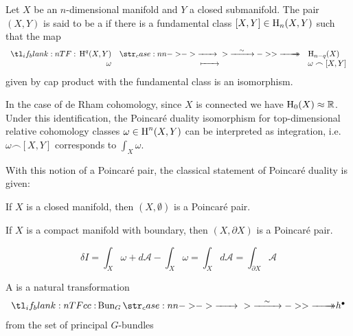 
\begin{definition}\label{defn:poincare-pair}
	Let $X$ be an $n$-dimensional manifold and $Y$ a closed submanifold. The pair $(X,Y)$ is said to be a  if there is a fundamental class $[X, Y]\in \operatorname{H}_n(X,Y)$ such that the map
	\[
		\lkxfunc{}{\H^q(X,Y)}{\H_{n-q}(X)}{\omega}{\omega \frown [X, Y]}
	\]
	given by cap product with the fundamental class is an isomorphism.
\end{definition}

\begin{remark}\label{rmk:duality-integration}
In the case of de Rham cohomology, since $X$ is connected we have $\operatorname{H}_0(X)\approx \mathbb{R}$. Under this identification, the Poincar\'e duality isomorphism for top-dimensional relative cohomology classes $\omega\in \operatorname{H}^n(X,Y)$ can be interpreted as integration, i.e. $\omega\frown [X,Y]$ corresponds to $\int_X \omega$. 
\end{remark}

With this notion of a Poincar\'e pair, the classical statement of Poincar\'e duality is given:

\begin{theorem}\label{thm:poincare-duality}
	If $X$ is a closed manifold, then $(X,\emptyset)$ is a Poincar\'e pair.
\end{theorem}

\begin{theorem}\label{thm:poincare-lefschetz-duality}
	If $X$ is a compact manifold with boundary, then $(X,\partial X)$ is a Poincar\'e pair.
\end{theorem}

\[
	\delta I = \int_X \omega + d\mathcal{A} - \int_X \omega =\int_X d\mathcal{A} =\int_{\partial X} \mathcal{A}
\]

\begin{definition*}
	A  is a natural transformation 
	\[
		\lkxfunc{c}{\Bun_{G}}{h^\bullet}
	\]
	from the set of principal $G$-bundles
\end{definition*}


